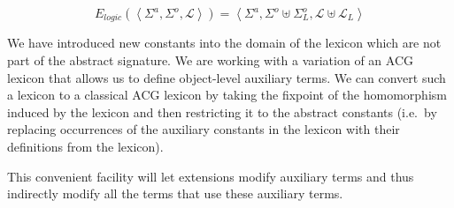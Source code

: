 $$
E_{logic}(\left< \Sigma^a, \Sigma^o, \mathcal{L} \right>) = \left< \Sigma^a, \Sigma^o \uplus \Sigma^o_L, \mathcal{L} \uplus \mathcal{L}_L \right>
$$

We have introduced new constants into the domain of the lexicon which are
not part of the abstract signature. We are working with a variation of an
ACG lexicon that allows us to define object-level auxiliary terms. We can
convert such a lexicon to a classical ACG lexicon by taking the fixpoint of
the homomorphism induced by the lexicon and then restricting it to the
abstract constants (i.e.\ by replacing occurrences of the auxiliary
constants in the lexicon with their definitions from the lexicon).

This convenient facility will let extensions modify auxiliary terms and
thus indirectly modify all the terms that use these auxiliary terms.
